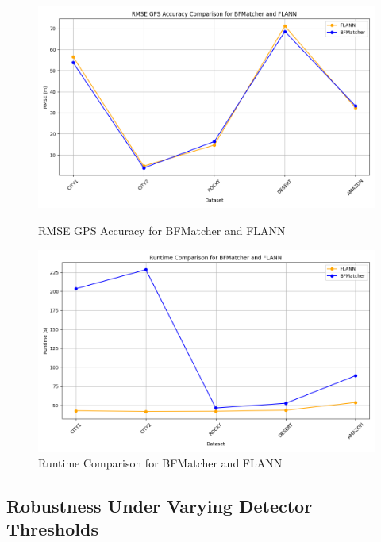 \begin{figure}[H]
    \centering
    \begin{minipage}{0.45\textwidth}
        \centering
        \includegraphics[width=\textwidth]{./Chapter 4/testresults/rmse_flann_bf.png}
        \caption{RMSE GPS Accuracy for BFMatcher and FLANN}
        \label{fig:rmse_flann_bf}
    \end{minipage}\hfill
    \begin{minipage}{0.45\textwidth}
        \centering
        \includegraphics[width=\textwidth]{./Chapter 4/testresults/runtime_flann_bf.png}
        \caption{Runtime Comparison for BFMatcher and FLANN}
        \label{fig:runtime_flann_bf}
    \end{minipage}
\end{figure}



\subsection{Robustness Under Varying Detector Thresholds}

